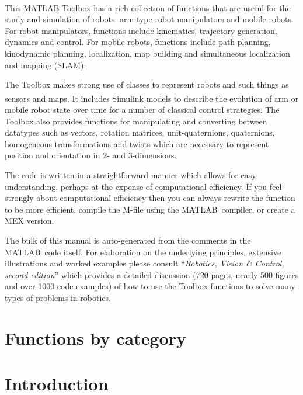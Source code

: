 \documentclass[a4paper,twoside]{report}
\def\Mlab{MATLAB}
\begin{document}
This \Mlab\textsuperscript{\textregistered} Toolbox has a rich collection of functions that are useful for the study and simulation
of robots:  arm-type robot manipulators and mobile robots.
For robot manipulators, functions include kinematics, trajectory generation, dynamics and  control.
For mobile robots, functions include path planning, kinodynamic planning, 
localization, map building and simultaneous localization and mapping (SLAM).

The Toolbox makes strong use of classes to represent robots and such things as sensors and maps.
It includes Simulink\textsuperscript{\textregistered} models to describe the evolution of arm or mobile robot state over time for a number of classical control
strategies. The Toolbox also provides functions for manipulating and converting between datatypes such as vectors, rotation matrices, unit-quaternions, quaternions, homogeneous transformations and twists which are necessary to represent  position and orientation in 2- and
3-dimensions.

The code is written in a straightforward manner which allows
for easy understanding, perhaps at the expense of computational efficiency.
If you feel strongly about computational efficiency then you can always
rewrite the function to be more efficient,
compile the M-file using the \Mlab\   compiler, or
create a MEX version.

The bulk of this manual is auto-generated from the comments in the \Mlab\ code itself.
For elaboration on the underlying principles, extensive illustrations and worked examples please consult
 ``\textit{Robotics, Vision \& Control, second edition}''  which provides a detailed discussion (720 pages, nearly 500 figures and over 1000 code examples) of how to use the Toolbox functions to solve many types of problems in robotics.


\cleardoublepage
\chapter*{Functions by category}
\begin{multicols}{2}
\end{multicols}

\cleardoublepage
\tableofcontents

\newpage
\chapter{Introduction}
\end{document}

